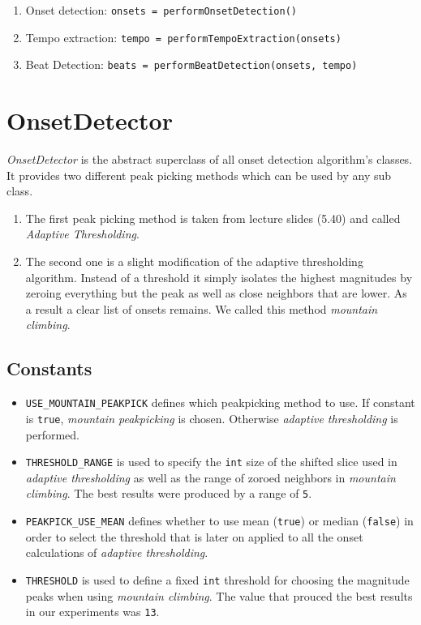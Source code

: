 \begin{enumerate}
  \item Onset detection: \texttt{onsets = performOnsetDetection()}
  \item Tempo extraction: \texttt{tempo = performTempoExtraction(onsets)}
  \item Beat Detection: \texttt{beats = performBeatDetection(onsets, tempo)}
\end{enumerate}

\section{\ttfamily OnsetDetector} \label{sec:onset}
\emph{OnsetDetector} is the abstract superclass of all onset detection
algorithm's classes. It provides two different peak picking methods which can be
used by any sub class.

\begin{enumerate}
  \item The first peak picking method is taken from lecture slides (5.40) and
  called \emph{Adaptive Thresholding}.
  \item The second one is a slight modification of the adaptive thresholding
  algorithm. Instead of a threshold it simply isolates the highest magnitudes by
  zeroing everything but the peak as well as close neighbors that are lower. As
  a result a clear list of onsets remains. We called this method \emph{mountain
  climbing}.
\end{enumerate}

\subsection*{Constants} \label{ssec:onsetconstants}
\begin{itemize}
  \item \texttt{USE\_MOUNTAIN\_PEAKPICK} defines which peakpicking method to
  use. If constant is \texttt{true}, \emph{mountain peakpicking} is chosen.
  Otherwise \emph{adaptive thresholding} is performed.
  \item \texttt{THRESHOLD\_RANGE} is used to specify the \texttt{int} size of
  the shifted slice used in \emph{adaptive thresholding} as well as the range of
  zoroed neighbors in \emph{mountain climbing}. The best results were produced
  by a range of \texttt{5}.
  \item \texttt{PEAKPICK\_USE\_MEAN} defines whether to use mean
  (\texttt{true}) or median (\texttt{false}) in order to select the threshold
  that is later on applied to all the onset calculations of \emph{adaptive
  thresholding}.
  \item \texttt{THRESHOLD} is used to define a fixed \texttt{int} threshold for
  choosing the magnitude peaks when using \emph{mountain climbing}. The value
  that prouced the best results in our experiments was \texttt{13}. 
\end{itemize}

